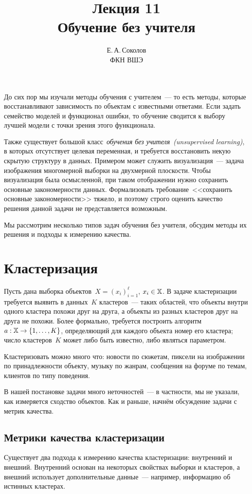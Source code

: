 \documentclass[12pt,fleqn]{article}
\begin{document}
\title{Лекция 11\\Обучение без учителя}
\author{Е.\,А.\,Соколов\\ФКН ВШЭ}
\maketitle

До сих пор мы изучали методы обучения с учителем~--- то есть методы,
которые восстанавливают зависимость по объектам с известными ответами.
Если задать семейство моделей и функционал ошибки,
то обучение сводится к выбору лучшей модели с точки зрения этого функционала.

Также существует большой класс~\emph{обучения без учителя~(unsupervised learning)},
в которых отсутствует целевая переменная, и требуется восстановить
некую скрытую структуру в данных.
Примером может служить визуализация~--- задача изображения многомерной выборки
на двухмерной плоскости.
Чтобы визуализация была осмысленной, при таком отображении нужно сохранить
основные закономерности данных.
Формализовать требование~<<сохранить основные закономерности>> тяжело,
и поэтому строго оценить качество решения данной задачи не представляется возможным.

Мы рассмотрим несколько типов задач обучения без учителя, обсудим
методы их решения и подходы к измерению качества.

\section{Кластеризация}

Пусть дана выборка объектов~$X = (x_i)_{i = 1}^{\ell}$, $x_i \in \mathbb{X}$.
В задаче кластеризации требуется выявить в данных~$K$ кластеров~---
таких областей, что объекты внутри одного кластера похожи друг на друга,
а объекты из разных кластеров друг на друга не похожи.
Более формально, требуется построить алгоритм~$a: \mathbb{X} \to \{1, \dots, K\}$,
определяющий для каждого объекта номер его кластера;
число кластеров~$K$ может либо быть известно, либо являться параметром.

Кластеризовать можно много что: новости по сюжетам, пиксели на изображении по принадлежности объекту,
музыку по жанрам, сообщения на форуме по темам, клиентов по типу поведения.

В нашей постановке задачи много неточностей~---
в частности, мы не указали, как измеряется сходство объектов.
Как и раньше, начнём обсуждение задачи с метрик качества.

\subsection{Метрики качества кластеризации}
Существует два подхода к измерению качества кластеризации: внутренний и внешний.
Внутренний основан на некоторых свойствах выборки и кластеров,
а внешний использует дополнительные данные~--- например, информацию об истинных кластерах.
\end{document}
